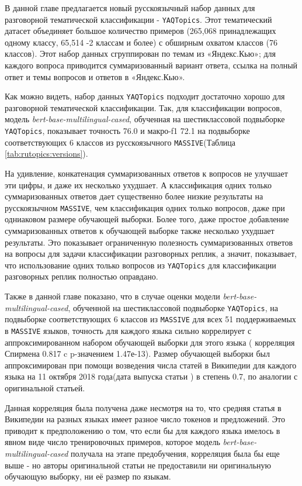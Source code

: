 В данной главе предлагается новый русскоязычный набор данных для разговорной тематической классификации - \texttt{YAQTopics}. Этот тематический датасет объединяет большое количество примеров (265,068 принадлежащих одному классу, 65,514 -2 классам и более) с обширным охватом классов (76 классов). Этот набор данных сгруппирован по темам из «Яндекс.Кью»; для каждого вопроса приводится суммаризованный вариант ответа, ссылка на полный ответ и темы вопросов и ответов в «Яндекс.Кью».

Как можно видеть, набор данных \texttt{YAQTopics} подходит достаточно хорошо для разговорной тематической классификации. Так, для классификации вопросов, модель \textit{bert-base-multilingual-cased}, обученная на шестиклассовой подвыборке \texttt{YAQTopics}, показывает точность 76.0 и макро-f1 72.1 на подвыборке соответствующих 6 классов из русскоязычного \texttt{MASSIVE}(Таблица \ref{tab:rutopics:versions}). 

 На удивление, конкатенация суммаризованных ответов к вопросов не улучшает эти цифры, и даже их несколько ухудшает. А классификация одних только суммаризованных ответов дает существенно более низкие результаты на русскоязычном \texttt{MASSIVE}, чем классификация одних только вопросов, даже при одниаковом размере обучающей выборки. Более того, даже простое добавление суммаризованных ответов к обучающей выборке также несколько ухудшает результаты. Это показывает ограниченную полезность суммаризованных ответов на вопросы для задачи классификации разговорных реплик, а значит, показывает, что использование одних только вопросов  из \texttt{YAQTopics} для классификации разговорных реплик полностью оправдано. 

Также в данной главе показано, что в случае оценки модели  \textit{bert-base-multilingual-cased}, обученной на шестиклассовой подвыборке \texttt{YAQTopics}, на подвыборке соответствующих 6 классов из \texttt{MASSIVE} для всех 51 поддерживаемых в \texttt{MASSIVE} языков, точность для каждого языка сильно коррелирует с аппроксимированном набором обучающей выборки для этого языка ( корреляция Спирмена 0.817 c p-значением 1.47е-13). Размер обучающей выборки был аппроксимирован при помощи возведения числа статей в Википедии для каждого языка на 11 октября 2018 года(дата выпуска статьи \cite{bert}) в степень 0.7, по аналогии с оригинальной статьей. 

Данная корреляция была получена даже несмотря на то, что средняя статья в Википедии на разных языках имеет разное число токенов и предложений. Это приводит к предположению о том, что если бы для каждого языка имелось в явном виде число тренировочных примеров, которое модель \textit{bert-base-multilingual-cased} получала на этапе предобучения, корреляция была бы еще выше - но авторы оригинальной статьи не предоставили ни оригинальную обучающую выборку, ни её размер по языкам. 

